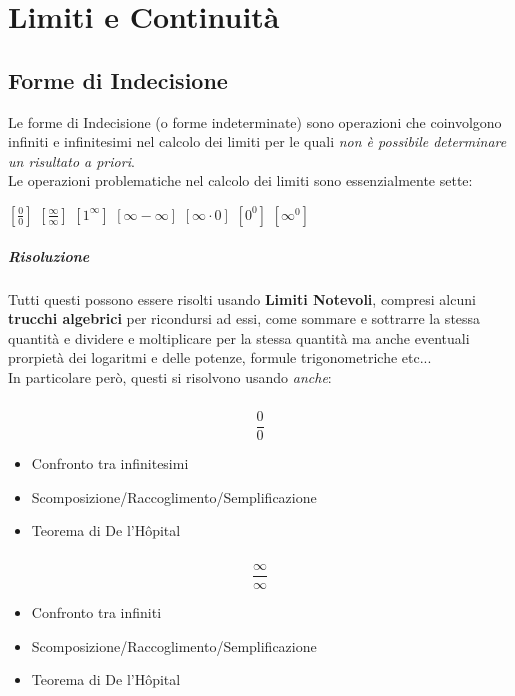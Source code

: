\chapter{Limiti e Continuità}

\section{Forme di Indecisione}
\label{sec:forme_di_indecisione}
Le forme di Indecisione (o forme indeterminate) sono operazioni che coinvolgono infiniti e infinitesimi nel calcolo dei limiti per le quali \emph{non è possibile determinare un risultato a priori}.
\\Le operazioni problematiche nel calcolo dei limiti sono essenzialmente sette:
\begin{center}
	$[\frac{0}{0}]$ $[\frac{\infty}{\infty}]$ $[1^\infty]$ $[\infty - \infty]$ $[\infty \cdot 0]$ $[0^0]$ $[\infty^0]$
\end{center}

\paragraph{Risoluzione}Tutti questi possono essere risolti usando \textbf{Limiti Notevoli}, compresi alcuni \textbf{trucchi algebrici} per ricondursi ad essi,
come sommare e sottrarre la stessa quantità e dividere e moltiplicare per la stessa quantità
ma anche eventuali prorpietà dei logaritmi e delle potenze, formule trigonometriche etc...
\\In particolare però, questi si risolvono usando \emph{anche}:
\paragraph*{}$$\frac{0}{0}$$
\begin{itemize}
	\item Confronto tra infinitesimi
	\item Scomposizione/Raccoglimento/Semplificazione
	\item Teorema di De l'Hôpital
\end{itemize}
\paragraph*{}$$\frac{\infty}{\infty}$$
\begin{itemize}
	\item Confronto tra infiniti
	\item Scomposizione/Raccoglimento/Semplificazione
	\item Teorema di De l'Hôpital
\end{itemize}
